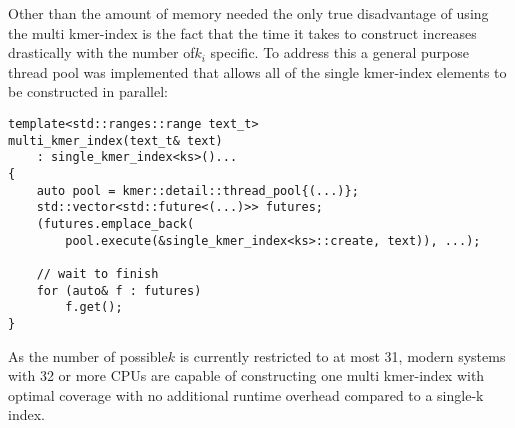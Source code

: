 Other than the amount of memory needed the only true disadvantage
of using the multi kmer-index is the fact that the time it takes to
construct increases drastically with the number of$k_{i}$ specific.
To address this a general purpose thread pool was implemented that
allows all of the single kmer-index elements to be constructed in
parallel:

\begin{lstlisting}[caption={Paralell invocation of the create function for individual kmer-index
elements during construction of the multi kmer-index.}]
template<std::ranges::range text_t>
multi_kmer_index(text_t& text)
	: single_kmer_index<ks>()...
{
	auto pool = kmer::detail::thread_pool{(...)};
	std::vector<std::future<(...)>> futures;
	(futures.emplace_back(
		pool.execute(&single_kmer_index<ks>::create, text)), ...);

	// wait to finish
	for (auto& f : futures)
		f.get();
}
\end{lstlisting}

As the number of possible$k$ is currently restricted to at most 31,
modern systems with 32 or more CPUs are capable of constructing one
multi kmer-index with optimal coverage with no additional runtime
overhead compared to a single-k index.

\pagebreak{}




